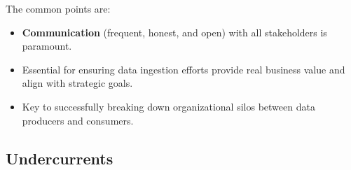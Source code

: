 The common points are:
\begin{itemize}[label=\textbullet]
    \item \textbf{Communication} (frequent, honest, and open) with
    all stakeholders is paramount.
    \item Essential for ensuring data ingestion efforts provide
    real business value and align with strategic goals.
    \item Key to successfully breaking down organizational
    silos between data producers and consumers.
\end{itemize}






\subsection{Undercurrents}



